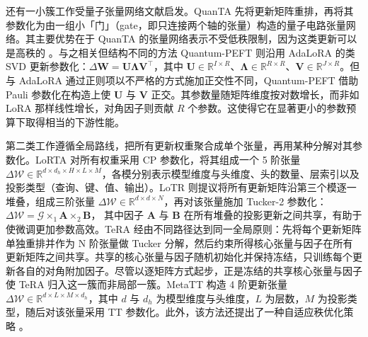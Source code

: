 \documentclass[11pt]{article}
\newcommand{\R}{\mathbb{R}}
\newcommand{\ten}[1]{\mathcal{#1}}
\newcommand{\mat}[1]{\mathbf{#1}}
\begin{document}
还有一小簇工作受量子张量网络文献启发。QuanTA \cite{chen2024quanta} 先将更新矩阵重排，再将其参数化为由一组小「门」（gate，即只连接两个轴的张量）构造的量子电路张量网络。其主要优势在于 QuanTA 的张量网络表示不受低秩限制，因为这类更新可以是高秩的 \cite{chen2024quanta}。与之相关但结构不同的方法 Quantum-PEFT \cite{koikeakino2025quantumpeft} 则沿用 AdaLoRA \cite{zhang2023adalora} 的类 SVD 更新参数化：$\Delta \mat{W} = \mat{U} \bm{\Lambda} \mat{V}^\top$，其中 $\mat{U} \in \R^{I \times R}$、$\bm{\Lambda} \in \R^{R \times R}$、$\mat{V} \in \R^{J \times R}$。但与 AdaLoRA 通过正则项以不严格的方式施加正交性不同，Quantum-PEFT 借助 Pauli 参数化在构造上使 $\mat{U}$ 与 $\mat{V}$ 正交。其参数量随矩阵维度按对数增长，而非如 LoRA 那样线性增长，对角因子则贡献 $R$ 个参数。这使得它在显著更小的参数预算下取得相当的下游性能。


第二类工作遵循全局路线，把所有更新权重聚合成单个张量，再用某种分解对其参数化。LoRTA \cite{hounie2024lorta} 对所有权重采用 CP 参数化，将其组成一个 5 阶张量 $\Delta \ten{W} \in \R^{d\times d_h\times H\times L\times M}$，各模分别表示模型维度与头维度、头的数量、层索引以及投影类型（查询、键、值、输出）。LoTR \cite{bershatsky2024lotr} 则提议将所有更新矩阵沿第三个模逐一堆叠，组成三阶张量 $\Delta \ten{W} \in \R^{d \times d \times N}$，再对该张量施加 Tucker-2 参数化：
$\Delta \ten{W} = \ten{G} \times_1 \mat{A} \times_2 \mat{B}$，
其中因子 $\mat{A}$ 与 $\mat{B}$ 在所有堆叠的投影更新之间共享，有助于使微调更加参数高效。TeRA \cite{gu2026tera} 经由不同路径达到同一全局原则：先将每个更新矩阵单独重排并作为 N 阶张量做 Tucker 分解，然后约束所得核心张量与因子在所有更新矩阵之间共享。共享的核心张量与因子随机初始化并保持冻结，只训练每个更新各自的对角附加因子。尽管以逐矩阵方式起步，正是冻结的共享核心张量与因子使 TeRA 归入这一簇而非局部一簇。MetaTT \cite{lopezpiqueres2025metatt} 构造 4 阶更新张量 $\Delta \ten{W} \in \R^{d\times L\times M\times d_h}$，其中 $d$ 与 $d_h$ 为模型维度与头维度，$L$ 为层数，$M$ 为投影类型，随后对该张量采用 TT 参数化。此外，该方法还提出了一种自适应秩优化策略 \cite{lopezpiqueres2025metatt}。


\end{document}
